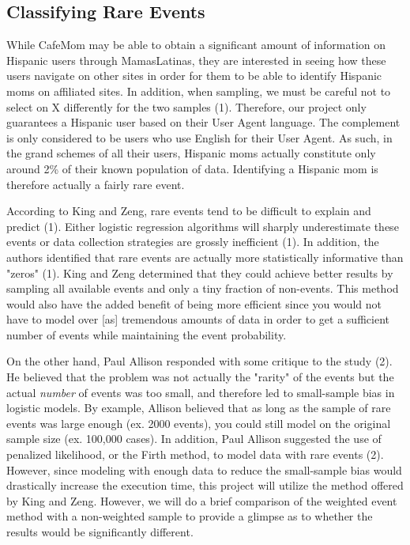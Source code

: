 \documentclass[a4paper]{article}
\begin{document}
\begin{multicols}{2}
\subsection*{Classifying Rare Events}
While CafeMom may be able to obtain a significant amount of information on Hispanic users through MamasLatinas, they are interested in seeing how these users navigate on other sites in order for them to be able to identify Hispanic moms on affiliated sites. In addition, when sampling, we must be careful not to select on X differently for the two samples (1). Therefore, our project only guarantees a Hispanic user based on their User Agent language. The complement is only considered to be users who use English for their User Agent. As such, in the grand schemes of all their users, Hispanic moms actually constitute only around 2\% of their known population of data. Identifying a Hispanic mom is therefore actually a fairly rare event.

According to King and Zeng, rare events tend to be difficult to explain and predict (1). Either logistic regression algorithms will sharply underestimate these events or data collection strategies are grossly inefficient (1). In addition, the authors identified that rare events are actually more statistically informative than "zeros" (1). King and Zeng determined that they could achieve better results by sampling all available events and only a tiny fraction of non-events. This method would also have the added benefit of being more efficient since you would not have to model over [as] tremendous amounts of data in order to get a sufficient number of events while maintaining the event probability.

On the other hand, Paul Allison responded with some critique to the study (2). He believed that the problem was not actually the "rarity" of the events but the actual \emph{number} of events was too small, and therefore led to small-sample bias in logistic models. By example, Allison believed that as long as the sample of rare events was large enough (ex. 2000 events), you could still model on the original sample size (ex. 100,000 cases). In addition, Paul Allison suggested the use of penalized likelihood, or the Firth method, to model data with rare events (2). However, since modeling with enough data to reduce the small-sample bias would drastically increase the execution time, this project will utilize the method offered by King and Zeng. However, we will do a brief comparison of the weighted event method with a non-weighted sample to provide a glimpse as to whether the results would be significantly different.


\end{multicols}
\end{document}
